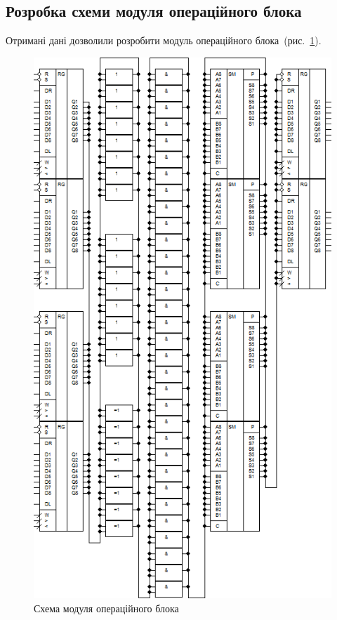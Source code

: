 \documentclass[
	a4paper,
	oneside,
	DIV = 12,
	12pt,
	headings = normal,
]{scrartcl}
\begin{document}
		\subsection{Розробка схеми модуля операційного блока}
			Отримані дані дозволили розробити модуль операційного блока~(рис.~\ref{fig:02-summation-principal-schematic}).
			\begin{figure}[!htbp]
				\centering
				\includegraphics[height = 38\baselineskip]{./assets/02-summation-principal-schematic.png}
				\caption{Схема модуля операційного блока}
				\label{fig:02-summation-principal-schematic}
			\end{figure}
\end{document}
